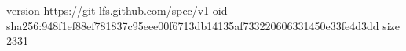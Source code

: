 version https://git-lfs.github.com/spec/v1
oid sha256:948f1ef88ef781837c95eee00f6713db14135af733220606331450e33fe4d3dd
size 2331

